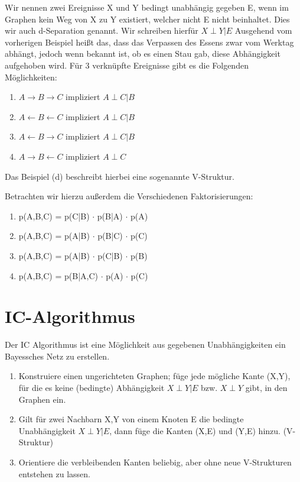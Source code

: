 Wir nennen zwei Ereignisse X und Y bedingt unabhängig gegeben E, wenn im Graphen kein Weg von X zu Y existiert, welcher nicht E nicht beinhaltet.
Dies wir auch d-Separation genannt.
Wir schreiben hierfür
$X \perp Y | E$
Ausgehend vom vorherigen Beispiel heißt das, dass das Verpassen des Essens zwar vom Werktag abhängt, jedoch wenn bekannt ist, ob es einen Stau gab, diese Abhängigkeit aufgehoben wird.
Für 3 verknüpfte Ereignisse gibt es die Folgenden Möglichkeiten:
\begin{enumerate}[label=(\alph*)]
\item $A \rightarrow B \rightarrow C$ impliziert $A \perp C | B$
\item $A \leftarrow B \leftarrow C$ impliziert $A \perp C | B$
\item $A \leftarrow B \rightarrow C$ impliziert $A \perp C | B$
\item $A \rightarrow B \leftarrow C$ impliziert $A \perp C$
\end{enumerate}
Das Beispiel (d) beschreibt hierbei eine sogenannte V-Struktur.

Betrachten wir hierzu außerdem die Verschiedenen Faktorisierungen:
\begin{enumerate}[label=(\alph*)]
\item p(A,B,C) = p(C|B) $\cdot$ p(B|A) $\cdot$ p(A)
\item p(A,B,C) = p(A|B) $\cdot$ p(B|C) $\cdot$ p(C)
\item p(A,B,C) = p(A|B) $\cdot$ p(C|B) $\cdot$ p(B)
\item p(A,B,C) = p(B|A,C) $\cdot$ p(A) $\cdot$ p(C)
\end{enumerate}

\section{IC-Algorithmus}
Der IC Algorithmus ist eine Möglichkeit aus gegebenen Unabhängigkeiten ein Bayessches Netz zu erstellen.
\begin{enumerate}
\item Konstruiere einen ungerichteten Graphen; füge jede mögliche Kante (X,Y), für die es keine (bedingte) Abhängigkeit $X \perp Y | E$ bzw. $X \perp Y$ gibt, in den Graphen ein.
\item Gilt für zwei Nachbarn X,Y von einem Knoten E die bedingte Unabhängigkeit $X \perp Y | E$, dann füge die Kanten (X,E) und (Y,E) hinzu. (V-Struktur)
\item Orientiere die verbleibenden Kanten beliebig, aber ohne neue V-Strukturen entstehen zu lassen.
\end{enumerate}

